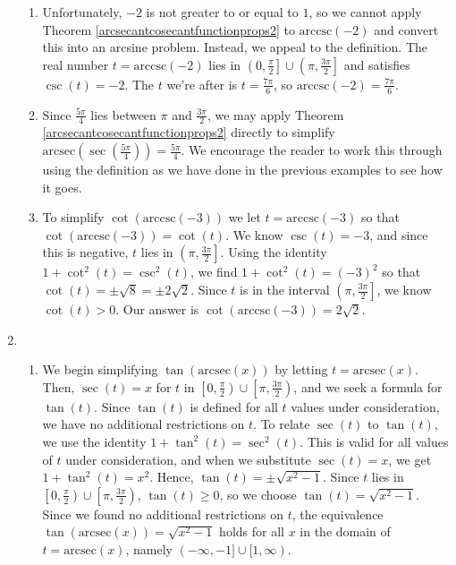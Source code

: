 \documentclass[12pt]{ximera}
\begin{document}
\begin{example}
\begin{enumerate}
\begin{enumerate}
\item  Unfortunately, $-2$ is not greater to or equal to $1$, so we cannot apply Theorem \ref{arcsecantcosecantfunctionprops2} to  $\mbox{arccsc}(-2)$ and convert this into an arcsine problem.  Instead, we appeal to the definition.  The real number $t = \mbox{arccsc}(-2)$ lies in $\left(0,\frac{\pi}{2} \right] \cup \left(\pi, \frac{3\pi}{2}\right]$ and satisfies $\csc(t) = -2$.  The $t$ we're after is $t = \frac{7\pi}{6}$, so $\mbox{arccsc}(-2) = \frac{7\pi}{6}$.

\item  Since $\frac{5\pi}{4}$ lies between $\pi$ and $\frac{3\pi}{2}$, we may apply Theorem \ref{arcsecantcosecantfunctionprops2} directly to simplify $\mbox{arcsec}\left( \sec\left( \frac{5\pi}{4} \right) \right) = \frac{5\pi}{4}$.  We encourage the reader to work this through using the definition as we have done in the  previous examples to see how it goes.

\item  To simplify $\cot\left(\mbox{arccsc}\left(-3\right)\right)$ we let $t = \mbox{arccsc}\left(-3\right)$ so that  $\cot\left(\mbox{arccsc}\left(-3\right)\right) = \cot(t)$.  We know $\csc(t) = -3$, and since this is negative,  $t$ lies in $\left( \pi, \frac{3\pi}{2}\right]$.  Using the identity $1 + \cot^{2}(t) = \csc^{2}(t)$, we find $1 + \cot^{2}(t) = (-3)^2$ so that $\cot(t) = \pm \sqrt{8} = \pm 2 \sqrt{2}$.  Since $t$ is in the interval $\left(\pi, \frac{3\pi}{2}\right]$, we know $\cot(t) > 0$.  Our answer is $\cot\left(\mbox{arccsc}\left(-3\right)\right) = 2 \sqrt{2}$.

\end{enumerate}

\item 
\begin{enumerate}

\item  We begin simplifying  $\tan(\mbox{arcsec}(x))$ by letting $t = \mbox{arcsec}(x)$.  Then, $\sec(t) = x$ for $t$ in $\left[0, \frac{\pi}{2} \right) \cup \left[\pi, \frac{3\pi}{2} \right)$, and we seek a formula for $\tan(t)$.  Since $\tan(t)$ is defined for all $t$ values under consideration, we have no additional restrictions on $t$.  To relate $\sec(t)$ to $\tan(t)$, we use the identity $1 + \tan^{2}(t) = \sec^{2}(t)$.  This is valid for all values of $t$ under consideration, and when we substitute $\sec(t) = x$, we get $1 + \tan^{2}(t) = x^2$.  Hence, $\tan(t) = \pm \sqrt{x^2-1}$. Since $t$ lies in $\left[0, \frac{\pi}{2} \right) \cup \left[\pi, \frac{3\pi}{2} \right)$, $\tan(t) \geq 0$, so we choose $\tan(t) = \sqrt{x^2-1}$.  Since we found no additional restrictions on $t$, the equivalence $\tan(\mbox{arcsec}(x)) = \sqrt{x^2-1}$ holds for all $x$ in the domain of $t = \mbox{arcsec}(x)$, namely $(-\infty, -1] \cup [1,\infty)$.


\end{enumerate}
\end{enumerate}
\end{example}
\end{document}
